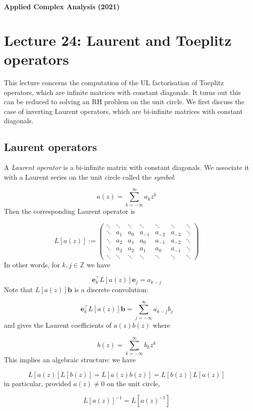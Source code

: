 \documentclass[12pt,landscape]{article}
\def\Z{ {\mathbb Z} }
\def\vc#1{ {\mathbf #1} }
\def\sopmatrix#1{ \begin{pmatrix}#1\end{pmatrix} }
\begin{document}
{\LARGE
\sf
\textbf{Applied Complex Analysis (2021)}

\section{Lecture 24: Laurent and Toeplitz operators}
This lecture concerns the computation of the UL factorisation of Toeplitz operators, which are infinite matrices with constant diagonals. It turns out this can be reduced to solving an RH problem on the unit circle.  We first discuss the case of inverting Laurent operators, which are bi-infinite matrices with constant diagonals.

\subsection{Laurent operators}
A \emph{Laurent operator} is a bi-infinite matrix with constant diagonals. We associate it with a Laurent series on the unit circle called the \emph{symbol}:

\[
a(z) = \sum_{k=-\infty}^\infty a_k z^k
\]
Then the corresponding Laurent operator is

\[
L[a(z)] := \sopmatrix{
\ddots & \ddots & \ddots& \ddots& \ddots& \ddots& \ddots \\
\ddots  & a_1 & a_0 & a_{-1} & a_{-2} & a_{-3} & \ddots \\
\ddots  & a_2 & a_1 & a_0 & a_{-1} & a_{-2} & \ddots \\
\ddots  & a_3 & a_2 & a_1 & a_0 & a_{-1} &  \ddots \\
\ddots & \ddots & \ddots& \ddots& \ddots& \ddots& \ddots
}
\]
In other words, for $k,j \in \Z$ we have

\[
\vc e_k^\top L[a(z)] \vc e_j = a_{k-j}
\]
Note that $L[a(z)] \vc b$ is a discrete convolution:

\[
\vc e_k^\top L[a(z)] \vc b = \sum_{j=-\infty}^\infty a_{k-j} b_j
\]
and gives the Laurent coefficients of $a(z) b(z)$ where

\[
b(z) = \sum_{k=-\infty}^\infty b_k z^k
\]
This implies an algebraic structure: we have

\[
L[a(z)] L[b(z)] = L[a(z)b(z)] = L[b(z)] L[a(z)]
\]
in particular, provided $a(z) \neq 0$ on the unit circle,

\[
L[a(z)]^{-1} = L[a(z)^{-1}]
\]
}
\end{document}
